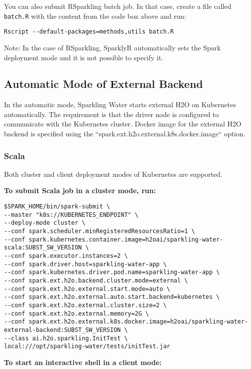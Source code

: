 You can also submit RSparkling batch job. In that case, create a file called \texttt{batch.R} with the content
from the code box above and run:

\begin{lstlisting}[style=Bash]
Rscript --default-packages=methods,utils batch.R
\end{lstlisting}

Note: In the case of RSparkling, SparklyR automatically sets the Spark deployment mode and it is not possible to specify it.

\subsection{Automatic Mode of External Backend}

In the automatic mode, Sparkling Water starts external H2O on Kubernetes automatically. The requirement is that the
driver node is configured to communicate with the Kubernetes cluster. Docker image for the external H2O backend
is specified using the ``spark.ext.h2o.external.k8s.docker.image`` option.

\subsubsection{Scala}

Both cluster and client deployment modes of Kubernetes are supported.

\textbf{To submit Scala job in a cluster mode, run:}

\begin{lstlisting}[style=Bash]
$SPARK_HOME/bin/spark-submit \
--master "k8s://KUBERNETES_ENDPOINT" \
--deploy-mode cluster \
--conf spark.scheduler.minRegisteredResourcesRatio=1 \
--conf spark.kubernetes.container.image=h2oai/sparkling-water-scala:SUBST_SW_VERSION \
--conf spark.executor.instances=2 \
--conf spark.driver.host=sparkling-water-app \
--conf spark.kubernetes.driver.pod.name=sparkling-water-app \
--conf spark.ext.h2o.backend.cluster.mode=external \
--conf spark.ext.h2o.external.start.mode=auto \
--conf spark.ext.h2o.external.auto.start.backend=kubernetes \
--conf spark.ext.h2o.external.cluster.size=2 \
--conf spark.ext.h2o.external.memory=2G \
--conf spark.ext.h2o.external.k8s.docker.image=h2oai/sparkling-water-external-backend:SUBST_SW_VERSION \
--class ai.h2o.sparkling.InitTest \
local:///opt/sparkling-water/tests/initTest.jar
\end{lstlisting}

\textbf{To start an interactive shell in a client mode:}

